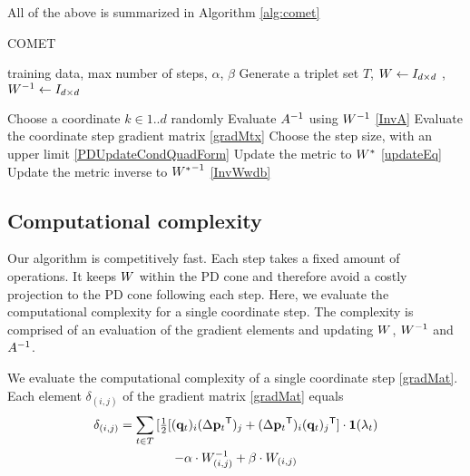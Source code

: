 \documentclass{article}
\begin{document}

All of the above is summarized in Algorithm \ref{alg:comet}

\begin{algorithm}[tb]
   \caption{COMET}
   \label{alg:comet}
\begin{algorithmic}[1]
    training data, max number of steps, $\alpha$, $\beta$
   \STATE Generate a triplet set $T$, ${W}  \leftarrow I_{d \times d}$ , ${W}^{-1}  \leftarrow I_{d \times d}$

   \REPEAT 
   \STATE Choose a coordinate $k \in {1..d}$ randomly
   \STATE Evaluate ${A}^{-1}$ using ${W}^{-1}$ \eqref{InvA}
   \STATE Evaluate the coordinate step gradient matrix \eqref{gradMtx}
   \STATE Choose the step size, with an upper limit  \eqref{PDUpdateCondQuadForm}
   \STATE Update the metric to ${{W^*}}$ \eqref{updateEq}
   \STATE Update the metric inverse to ${{W^*}}^{-1}$ \eqref{InvWwdb}
\end{algorithmic}
\end{algorithm}

\subsection{Computational complexity}
Our algorithm is competitively fast. Each step takes a fixed amount of
operations. It keeps ${W}$ within the PD cone and therefore avoid a
costly projection to the PD cone following each step. Here, we
evaluate the computational complexity for a single coordinate
step. The complexity is comprised of an evaluation of the gradient
elements and updating ${W}$, ${W}^{-1}$ and ${A}^{-1}$.

We evaluate the computational complexity of a single coordinate step \eqref{gradMat}. Each element $\delta_{(i,j)}$ of the gradient matrix \eqref{gradMat} equals
\begin{multline}
\delta_{(i,j)} = \sum\limits_{t\in T}{ [\tfrac{1}{2}[({\mathbf{q}}_{t})_i(\Delta{\mathbf{p}}_{t}{}^\mathsf{T})_j + (\Delta{\mathbf{p}}_{t}{}^\mathsf{T})_i({\mathbf{q}}_{t})_j{}^\mathsf{T}] } \cdot \textbf{1}(\lambda_t)  \\ 
 - \alpha \cdot {W}^{-1}_{(i,j)} + \beta \cdot {W}_{(i,j)}
\label{gradMatElem}
\end{multline}
\end{document}

